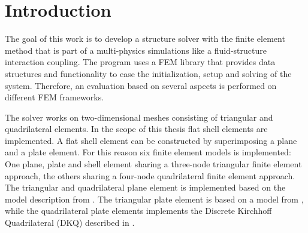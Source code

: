 \section{Introduction}




%
The goal of this work is to develop a structure solver with the finite element method that is part of a multi-physics simulations like a fluid-structure interaction coupling. The program uses a FEM library that provides data structures and functionality to ease the initialization, setup and solving of the system. Therefore, an evaluation based on several aspects is performed on different FEM frameworks.

The solver works on two-dimensional meshes consisting of triangular and quadrilateral elements. In the scope of this thesis flat shell elements are implemented. A flat shell element can be constructed by superimposing a plane and a plate element. For this reason six finite element models is implemented: One plane, plate and shell element sharing a three-node triangular finite element approach, the others sharing a four-node quadrilateral finite element approach. The triangular and quadrilateral plane element is implemented based on the model description from \cite{steinke2005finite}. The triangular plate element is based on a model from \cite{specht1988modified}, while the quadrilateral plate elements implements the Discrete Kirchhoff Quadrilateral (DKQ) described in \cite{zienkiewicz2000finite}.

